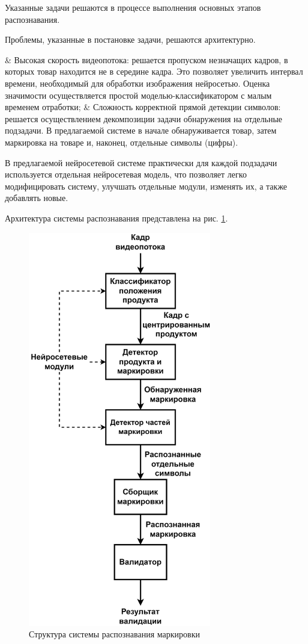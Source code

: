 Указанные задачи решаются в процессе выполнения основных этапов распознавания.

Проблемы, указанные в постановке задачи, решаются архитектурно.

\begin{easylistNum}
    & Высокая скорость видеопотока: решается пропуском незначащих кадров, в которых товар находится не в середине кадра. Это позволяет увеличить интервал времени, необходимый для обработки изображения нейросетью. Оценка значимости осуществляется простой моделью-классификатором с малым временем отработки;
    & Сложность корректной прямой детекции символов: решается осуществлением декомпозиции задачи обнаружения на отдельные подзадачи. В предлагаемой системе в начале обнаруживается товар, затем маркировка на товаре и, наконец, отдельные символы (цифры).
\end{easylistNum}

В предлагаемой нейросетевой системе практически для каждой подзадачи используется отдельная нейросетевая модель, что позволяет легко модифицировать систему, улучшать отдельные модули, изменять их, а также добавлять новые. 

Архитектура системы распознавания представлена на рис. \ref{fig:structure}.

\begin{figure}[!ht]
	\centering
	\includegraphics[width=8cm]{man-source/images/ch4/savushkin_structure.png}
	\caption{Структура системы распознавания маркировки}
	\label{fig:structure}
\end{figure}

